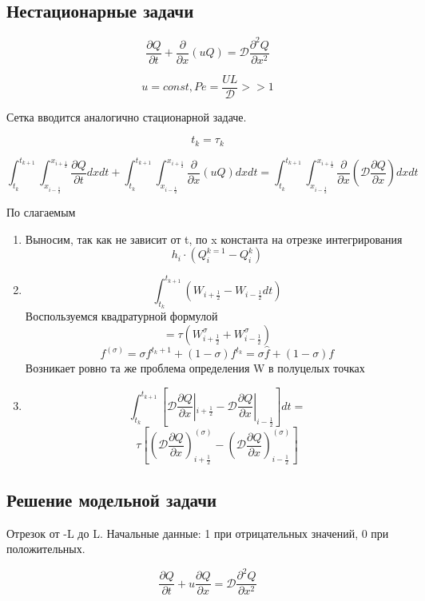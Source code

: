 \documentclass[12pt, a4paper]{article}
\begin{document}
\subsection{Нестационарные задачи}

\[ \frac{\partial Q}{\partial t} + \frac{\partial }{\partial x }(u Q) = \mathcal{D} \frac{\partial^2 Q }{\partial x^2 } \]

\[ u = const, {Pe} = \frac{U L }{\mathcal{D}} >> 1 \]

Сетка вводится аналогично стационарной задаче.

\[ t_k = \tau_k \]

\[ \int_{t_k }^{t_{k+1}}\int_{x_{i-\frac{1}{2}}}^{x_{i+\frac{1}{2}}} \frac{\partial Q }{\partial t} dx dt + \int_{t_k }^{t_{k+1}}\int_{x_{i-\frac{1}{2}}}^{x_{i+\frac{1}{2}}} \frac{\partial}{\partial x} (u Q) dx dt = \int_{t_k }^{t_{k+1}}\int_{x_{i-\frac{1}{2}}}^{x_{i+\frac{1}{2}}} \frac{\partial}{\partial x} (\mathcal{D} \frac{\partial Q }{\partial x }) dx dt \]

По слагаемым
\begin{enumerate}
	\item Выносим, так как не зависит от t, по x константа на отрезке интегрирования
	\[ h_i \cdot (Q^{k=1}_i - Q^k_i) \]
	\item \[ \int_{t_k }^{t_{k+1}}(W_{i+\frac{1}{2}} - W_{i-\frac{1}{2}} dt ) \]
	Воспользуемся квадратурной формулой
	\[ = \tau (W^{\sigma}_{i+\frac{1}{2}} + W^{\sigma}_{i-\frac{1}{2}}) \]
	\[ f^{(\sigma)} = \sigma f^{t_k + 1} + (1-\sigma) f^{t_k} = \sigma \hat{f} + (1-\sigma) f \]
	Возникает ровно та же проблема определения W в полуцелых точках
	\item
	\[ \int_{t_k }^{t_{k+1}} [ \mathcal{D} \frac{\partial Q }{\partial x} |_{i+\frac{1}{2}} - \mathcal{D} \frac{\partial Q }{\partial x} |_{i-\frac{1}{2}}] dt = \]
	\[ \tau [(\mathcal{D} \frac{\partial Q }{\partial x})_{i+\frac{1}{2}}^{(\sigma)} - (\mathcal{D} \frac{\partial Q }{\partial x})_{i-\frac{1}{2}}^{(\sigma)}] \]
\end{enumerate}

\subsection{Решение модельной задачи}

Отрезок от -L до L. Начальные данные: 1 при отрицательных значений, 0 при положительных.

\[ \frac{\partial Q }{\partial t } + u \frac{\partial Q }{\partial x} = \mathcal{D} \frac{\partial^2 Q }{\partial x^2} \]
\end{document}
